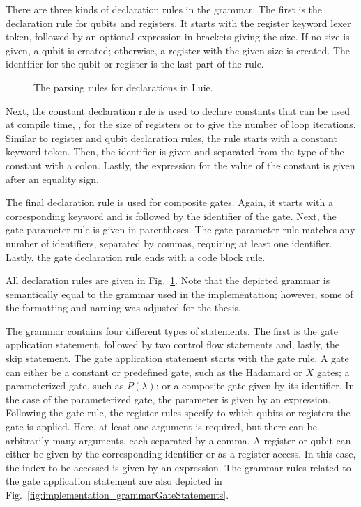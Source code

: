 There are three kinds of declaration rules in the grammar. The first is the declaration rule for qubits and registers. It starts with the register keyword lexer token, followed by an optional expression in brackets giving the size. If no size is given, a qubit is created; otherwise, a register with the given size is created. The identifier for the qubit or register is the last part of the rule.

\begin{figure}[htp]
    \centering
    
    \caption{The parsing rules for declarations in Luie.}
    \label{fig:implementation_grammarDeclarations}
\end{figure}

Next, the constant declaration rule is used to declare constants that can be used at compile time, \eg, for the size of registers or to give the number of loop iterations. Similar to register and qubit declaration rules, the rule starts with a constant keyword token. Then, the identifier is given and separated from the type of the constant with a colon. Lastly, the expression for the value of the constant is given after an equality sign.

The final declaration rule is used for composite gates. Again, it starts with a corresponding keyword and is followed by the identifier of the gate. Next, the gate parameter rule is given in parentheses. The gate parameter rule matches any number of identifiers, separated by commas, requiring at least one identifier. Lastly, the gate declaration rule ends with a code block rule.

All declaration rules are given in Fig.~\ref{fig:implementation_grammarDeclarations}. Note that the depicted grammar is semantically equal to the grammar used in the implementation; however, some of the formatting and naming was adjusted for the thesis.

The grammar contains four different types of statements. The first is the gate application statement, followed by two control flow statements and, lastly, the skip statement. The gate application statement starts with the gate rule. A gate can either be a constant or predefined gate, such as the Hadamard or $X$ gates; a parameterized gate, such as $P(\lambda)$; or a composite gate given by its identifier. In the case of the parameterized gate, the parameter is given by an expression. Following the gate rule, the register rules specify to which qubits or registers the gate is applied. Here, at least one argument is required, but there can be arbitrarily many arguments, each separated by a comma. A register or qubit can either be given by the corresponding identifier or as a register access. In this case, the index to be accessed is given by an expression. The grammar rules related to the gate application statement are also depicted in Fig.~\ref{fig:implementation_grammarGateStatements}.

